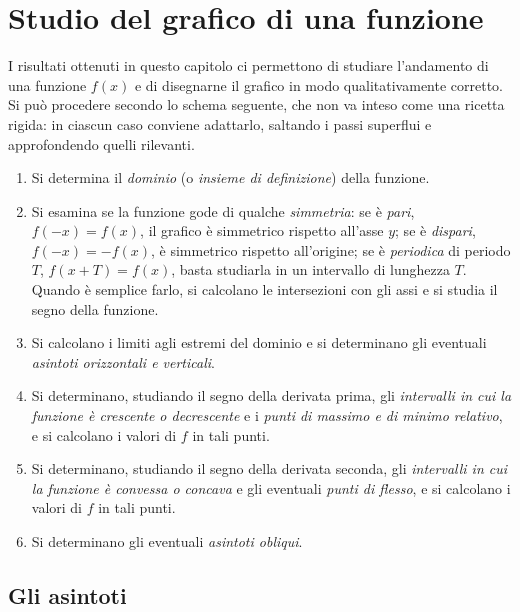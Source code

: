 \section{Studio del grafico di una funzione}
\label{sec:studio-funzione}

I risultati ottenuti in questo capitolo ci permettono di studiare l'andamento di una
funzione $f(x)$ e di disegnarne il grafico in modo qualitativamente corretto. Si può
procedere secondo lo schema seguente, che non va inteso come una ricetta rigida: in
ciascun caso conviene adattarlo, saltando i passi superflui e approfondendo quelli
rilevanti.

\begin{enumerate}[label=\textbf{\Alph*.}, leftmargin=2em]
  \item Si determina il \emph{dominio} (o \emph{insieme di definizione}) della funzione.
  \item Si esamina se la funzione gode di qualche \emph{simmetria}: se è \emph{pari},
  $f(-x)=f(x)$, il grafico è simmetrico rispetto all'asse $y$; se è \emph{dispari},
  $f(-x)=-f(x)$, è simmetrico rispetto all'origine; se è \emph{periodica} di periodo $T$,
  $f(x+T)=f(x)$, basta studiarla in un intervallo di lunghezza $T$. Quando è semplice
  farlo, si calcolano le intersezioni con gli assi e si studia il segno della funzione.
  \item Si calcolano i limiti agli estremi del dominio e si determinano gli eventuali
  \emph{asintoti orizzontali e verticali}.
  \item Si determinano, studiando il segno della derivata prima, gli \emph{intervalli in
  cui la funzione è crescente o decrescente} e i \emph{punti di massimo e di minimo
  relativo}, e si calcolano i valori di $f$ in tali punti.
  \item Si determinano, studiando il segno della derivata seconda, gli \emph{intervalli
  in cui la funzione è convessa o concava} e gli eventuali \emph{punti di flesso}, e si
  calcolano i valori di $f$ in tali punti.
  \item Si determinano gli eventuali \emph{asintoti obliqui}.
\end{enumerate}

\subsection{Gli asintoti}

